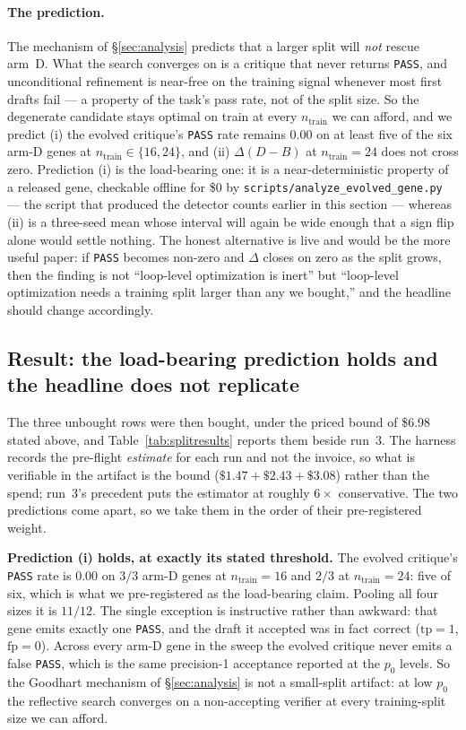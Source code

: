 \documentclass[11pt]{article}
\newcommand{\dd}{\ensuremath{\Delta}}
\begin{document}
\paragraph{The prediction.} The mechanism of \S\ref{sec:analysis} predicts that a larger split
will \emph{not} rescue arm~D. What the search converges on is a critique that never returns
\texttt{PASS}, and unconditional refinement is near-free on the training signal whenever most
first drafts fail --- a property of the task's pass rate, not of the split size. So the
degenerate candidate stays optimal on train at every $n_{\mathrm{train}}$ we can afford, and
we predict (i) the evolved critique's \texttt{PASS} rate remains $0.00$ on at least five of the
six arm-D genes at $n_{\mathrm{train}} \in \{16, 24\}$, and (ii) $\dd(D-B)$ at
$n_{\mathrm{train}}{=}24$ does not cross zero. Prediction (i) is the load-bearing one: it is a
near-deterministic property of a released gene, checkable offline for \$0 by
\texttt{scripts/analyze\_evolved\_gene.py} --- the script that produced the detector counts
earlier in this section --- whereas (ii) is a three-seed mean whose interval will
again be wide enough that a sign flip alone would settle nothing. The honest alternative is
live and would be the more useful paper: if \texttt{PASS} becomes non-zero and $\dd$ closes on
zero as the split grows, then the finding is not ``loop-level optimization is inert'' but
``loop-level optimization needs a training split larger than any we bought,'' and the headline
should change accordingly.

\subsection{Result: the load-bearing prediction holds and the headline does not replicate}
\label{sec:splitresult}

The three unbought rows were then bought, under the priced bound of \$6.98 stated above, and
Table~\ref{tab:splitresults} reports them beside run~3. The harness records the pre-flight
\emph{estimate} for each run and not the invoice, so what is verifiable in the artifact is the
bound ($\$1.47 + \$2.43 + \$3.08$) rather than the spend; run~3's precedent puts the estimator
at roughly $6\times$ conservative. The two predictions come apart, so we take them in the order
of their pre-registered weight.

\textbf{Prediction (i) holds, at exactly its stated threshold.} The evolved critique's
\texttt{PASS} rate is $0.00$ on $3/3$ arm-D genes at $n_{\mathrm{train}}{=}16$ and $2/3$ at
$n_{\mathrm{train}}{=}24$: five of six, which is what we pre-registered as the load-bearing
claim. Pooling all four sizes it is $11/12$. The single exception is instructive rather than
awkward: that gene emits exactly one \texttt{PASS}, and the draft it accepted was in fact
correct ($\mathrm{tp}{=}1$, $\mathrm{fp}{=}0$). Across every arm-D gene in the sweep the
evolved critique never emits a false \texttt{PASS}, which is the same precision-1 acceptance
reported at the $p_0$ levels. So the Goodhart mechanism of \S\ref{sec:analysis} is not a
small-split artifact: at low $p_0$ the reflective search converges on a non-accepting verifier
at every training-split size we can afford.
\end{document}
